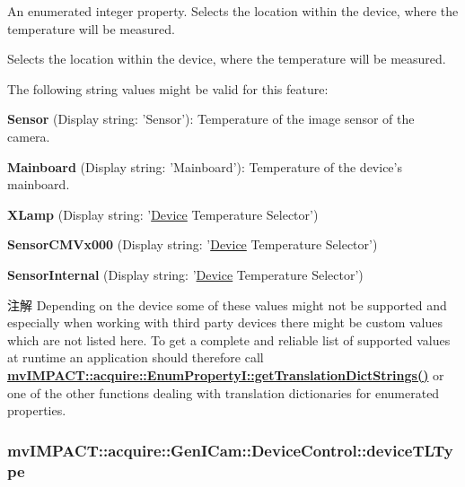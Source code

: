 An enumerated integer property. Selects the location within the device, where the temperature will be measured. 

Selects the location within the device, where the temperature will be measured.

The following string values might be valid for this feature\+:
\begin{DoxyItemize}
\item {\bfseries Sensor} (Display string\+: 'Sensor')\+: Temperature of the image sensor of the camera.
\item {\bfseries Mainboard} (Display string\+: 'Mainboard')\+: Temperature of the device's mainboard.
\item {\bfseries X\+Lamp} (Display string\+: '\hyperlink{classmv_i_m_p_a_c_t_1_1acquire_1_1_device}{Device} Temperature Selector')
\item {\bfseries Sensor\+C\+M\+Vx000} (Display string\+: '\hyperlink{classmv_i_m_p_a_c_t_1_1acquire_1_1_device}{Device} Temperature Selector')
\item {\bfseries Sensor\+Internal} (Display string\+: '\hyperlink{classmv_i_m_p_a_c_t_1_1acquire_1_1_device}{Device} Temperature Selector')
\end{DoxyItemize}

\begin{DoxyNote}{注解}
Depending on the device some of these values might not be supported and especially when working with third party devices there might be custom values which are not listed here. To get a complete and reliable list of supported values at runtime an application should therefore call {\bfseries \hyperlink{classmv_i_m_p_a_c_t_1_1acquire_1_1_enum_property_i_a0ba6ccbf5ee69784d5d0b537924d26b6}{mv\+I\+M\+P\+A\+C\+T\+::acquire\+::\+Enum\+Property\+I\+::get\+Translation\+Dict\+Strings()}} or one of the other functions dealing with translation dictionaries for enumerated properties. 
\end{DoxyNote}
\hypertarget{classmv_i_m_p_a_c_t_1_1acquire_1_1_gen_i_cam_1_1_device_control_a014a8319e9e0b720809caf29398e3b8b}{
\subsubsection[{device\+T\+L\+Type}]{ mv\+I\+M\+P\+A\+C\+T\+::acquire\+::\+Gen\+I\+Cam\+::\+Device\+Control\+::device\+T\+L\+Type}}\label{classmv_i_m_p_a_c_t_1_1acquire_1_1_gen_i_cam_1_1_device_control_a014a8319e9e0b720809caf29398e3b8b}


